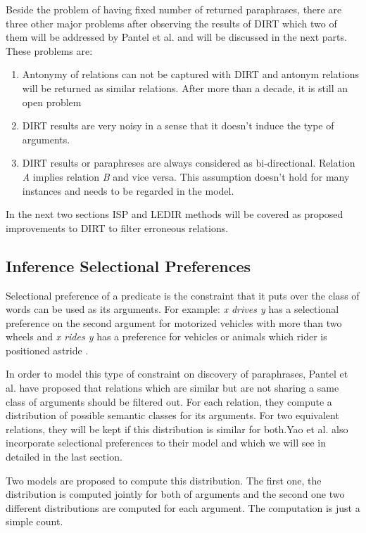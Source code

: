 \documentclass[12pt]{report}
\begin{document}
  Beside the problem of having fixed number of returned paraphrases, there are three other major 
  problems after observing the results of DIRT which two of them will be addressed by Pantel et al. and
  will be discussed in the next parts. These problems are:
  
  \begin{enumerate}
    \item Antonymy of relations can not be captured with DIRT and antonym relations will be returned as similar relations. After more than
    a decade, it is still an open problem
    \item DIRT results are very noisy in a sense that it doesn't induce the type of arguments.
    \item DIRT results or paraphreses are always considered as bi-directional. Relation \emph{A} implies relation \emph{B} and vice versa.
    This assumption doesn't hold for many instances and needs to be regarded in the model.
  \end{enumerate}
  
In the next two sections ISP and LEDIR methods will be covered as proposed improvements to DIRT to filter erroneous relations.
   

\subsection{Inference Selectional Preferences}
\label{ch:improve} 

Selectional preference of a predicate is the constraint that it puts over the class of words can be used as its arguments.
For example: \emph{x drives y} has a selectional preference on the second argument for motorized 
vehicles with more than two wheels and \emph {x rides y}
has a preference for vehicles or animals which rider is positioned astride \cite{Mechura2008} .

In order to model this type of constraint on discovery of paraphrases, Pantel et al. \cite{Pantel2007} have proposed that
relations which are similar but are not sharing a same class of arguments should be filtered out. For each relation, 
they compute a distribution of possible semantic classes for its arguments. For two equivalent relations, they will be kept
if this distribution is similar for both.Yao et al. \cite{Yao2011} also incorporate selectional preferences to their model and which we
will see in detailed in the last section.

Two models are proposed to compute this distribution. The first one, the distribution is computed jointly for both of arguments
and the second one two different distributions are computed for each argument. The computation is just a simple count.
\end{document}
